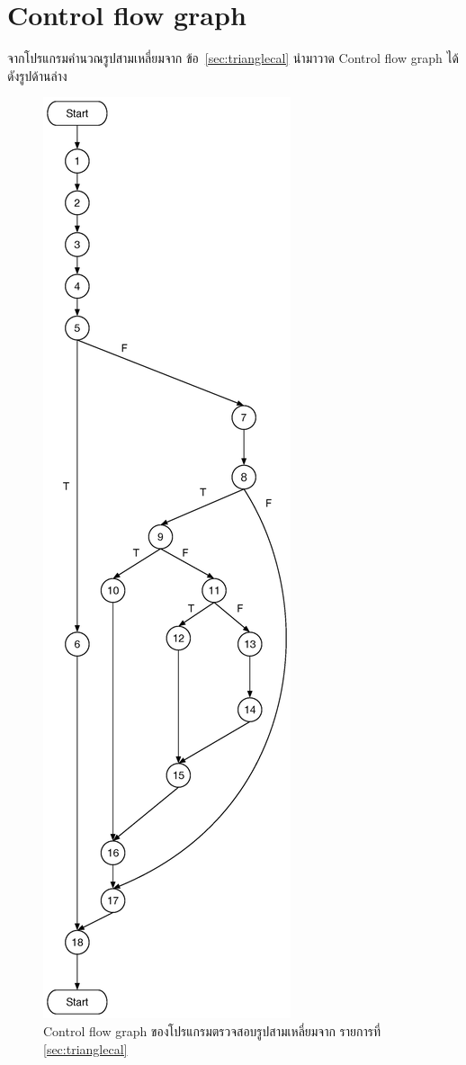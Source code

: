 \documentclass[12pt,a4paper]{article}
\newcommand{\numbername}{ข้อ}
\renewcommand{\lstlistingname}{รายการที่}
\begin{document}
\newpage
\clearpage
\section{Control flow graph}
จากโปรแกรมคำนวณรูปสามเหลี่ยมจาก \numbername~\ref{sec:trianglecal} นำมาวาด Control flow graph ได้ดังรูปด้านล่าง

\begin{figure}[h!]
    \label{fig:flowgraph}
    \centering
    \includegraphics[height=0.8\textheight]{img/graph-testing.eps}
    \caption{Control flow graph ของโปรแกรมตรวจสอบรูปสามเหลี่ยมจาก \lstlistingname\, \ref{sec:trianglecal}}
\end{figure}
\end{document}
